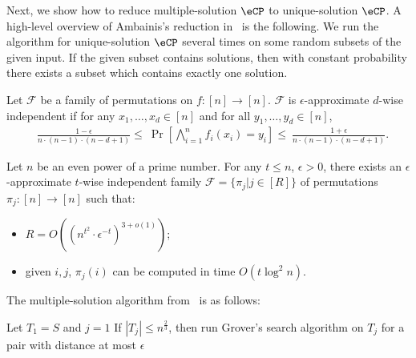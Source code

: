 Next, we show how to reduce multiple-solution $\eCP$ to unique-solution $\eCP$. A high-level overview of Ambainis's reduction in~\cite{r5} is the following. We run the algorithm for unique-solution $\eCP$ several times on some random subsets of the given input. If the given subset contains solutions, then with constant probability there exists a subset which contains exactly one solution. 

\begin{definition}[\cite{r5,r27}]
Let $\mathcal{F}$ be a family of permutations on $f:[n]\rightarrow [n]$. $\mathcal{F}$ is $\epsilon$-approximate $d$-wise independent if for any $x_1,\dots,x_d\in [n]$ and for all $y_1,\dots,y_d\in [n]$, 
\begin{align}
    &\frac{1-\epsilon}{n\cdot(n-1)\cdot (n-d+1)}\leq ~ \Pr\left[\bigwedge_{i=1}^n f_i(x_i) = y_i\right] \leq ~  \frac{1+\epsilon}{n\cdot(n-1)\cdot (n-d+1)}.
\end{align}
\end{definition}

\begin{lemma}[\cite{r5,r27}]\label{lem:ehash}
Let $n$ be an even power of a prime number. For any $t\leq n$, $\epsilon>0$, there exists an $\epsilon$-approximate $t$-wise independent family $\mathcal{F}=\{\pi_j| j\in [R]\}$ of permutations $\pi_j: [n]\rightarrow [n]$ such that: 
\begin{itemize}
    \item $R = O\left( \left(n^{t^2}\cdot \epsilon^{-t}\right)^{3+o(1)}   \right)$; 
    \item given $i,j$, $\pi_j(i)$ can be computed in time $O(t\log^2 n)$.
\end{itemize}
\end{lemma}



The multiple-solution algorithm from~\cite{r5} is as follows: 
\begin{algorithm}[h]
    Let $T_1 = S$ and $j=1$\;
      If $|T_j|\leq n^{\frac{2}{3}}$, then run Grover's search algorithm on $T_j$ for a pair with distance at most $\epsilon$ \label{line:basecase}\;
    \caption{The algorithm for multiple $\epsilon$-close pair}
    \label{alg:m_to_1}
\end{algorithm}

